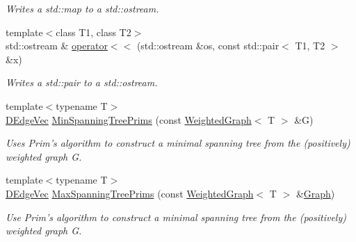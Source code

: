 \begin{CompactItemize}
\begin{CompactList}\small\item\em Writes a std::map to a std::ostream. \item\end{CompactList}\item 
\hypertarget{namespacedai_575f6202aa88de6bf5146b85d8832eb5}{
{\footnotesize template$<$class T1, class T2$>$ }\\std::ostream \& \hyperlink{namespacedai_575f6202aa88de6bf5146b85d8832eb5}{operator$<$$<$} (std::ostream \&os, const std::pair$<$ T1, T2 $>$ \&x)}
\label{namespacedai_575f6202aa88de6bf5146b85d8832eb5}

\begin{CompactList}\small\item\em Writes a std::pair to a std::ostream. \item\end{CompactList}\item 
{\footnotesize template$<$typename T$>$ }\\\hyperlink{namespacedai_e7764251ab4d4b2d4fbec214eac83079}{DEdgeVec} \hyperlink{namespacedai_7ede01daa445869cce29730d0cc29d74}{MinSpanningTreePrims} (const \hyperlink{classdai_1_1WeightedGraph}{WeightedGraph}$<$ T $>$ \&G)
\begin{CompactList}\small\item\em Uses Prim's algorithm to construct a minimal spanning tree from the (positively) weighted graph G. \item\end{CompactList}\item 
{\footnotesize template$<$typename T$>$ }\\\hyperlink{namespacedai_e7764251ab4d4b2d4fbec214eac83079}{DEdgeVec} \hyperlink{namespacedai_461d882462bc6625c3874e1481fd9d68}{MaxSpanningTreePrims} (const \hyperlink{classdai_1_1WeightedGraph}{WeightedGraph}$<$ T $>$ \&\hyperlink{namespacedai_dfcfd53771d59db79ddd826928e76400}{Graph})
\begin{CompactList}\small\item\em Use Prim's algorithm to construct a minimal spanning tree from the (positively) weighted graph G. \item\end{CompactList}\end{CompactItemize}
